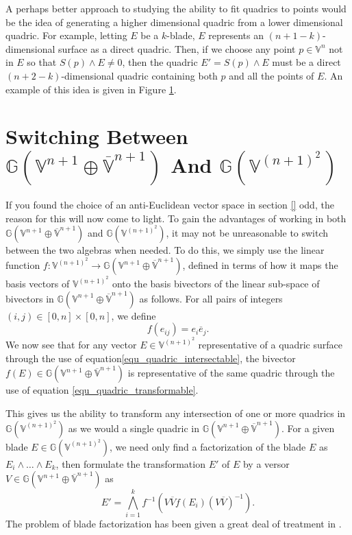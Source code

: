 \documentclass{birkjour}
\theoremstyle{definition}
\theoremstyle{remark}
\numberwithin{equation}{section}
\newcommand{\G}{\mathbb{G}}
\newcommand{\V}{\mathbb{V}}
\newcommand{\Vb}{\mathbb{\overline{V}}}
\begin{document}
A perhaps better approach to studying the ability to fit quadrics to
points would be the idea of generating a higher dimensional quadric
from a lower dimensional quadric.  For example, letting $E$ be a $k$-blade, $E$
represents an $(n+1-k)$-dimensional surface as a direct quadric.  Then,
if we choose any point $p\in\V^n$ not in $E$ so that $S(p)\wedge E\neq 0$,
then the quadric $E'=S(p)\wedge E$ must be a direct $(n+2-k)$-dimensional quadric containing
both $p$ and all the points of $E$.  An example of this idea is given in Figure \ref{}.



\section{Switching Between $\G(\V^{n+1}\oplus\Vb^{n+1})$ And $\G(\V^{(n+1)^2})$}


If you found the choice of an anti-Euclidean vector
space in section \eqref{} odd, the reason for this will
now come to light.  To gain the advantages of working
in both $\G(\V^{n+1}\oplus\Vb^{n+1})$ and $\G(\V^{(n+1)^2})$,
it may not be unreasonable to switch between the two
algebras when needed.  To do this, we simply use the linear
function $f:\V^{(n+1)^2}\to\G(\V^{n+1}\oplus\Vb^{n+1})$,
defined in terms of how it maps the basis vectors of $\V^{(n+1)^2}$ onto the
basis bivectors of the linear sub-space of bivectors in $\G(\V^{n+1}\oplus\Vb^{n+1})$ as follows.
For all pairs of integers $(i,j)\in[0,n]\times[0,n]$, we define
\begin{equation}
f(e_{ij})=e_i\overline{e}_j.
\end{equation}
We now see that for any vector $E\in\V^{(n+1)^2}$ representative of
a quadric surface through the use of equation\eqref{equ_quadric_intersectable}, the bivector
$f(E)\in\G(\V^{n+1}\oplus\Vb^{n+1})$ is representative of the same
quadric through the use of equation \eqref{equ_quadric_transformable}.

This gives us the ability to transform any intersection of one or more quadrics
in $\G(\V^{(n+1)^2})$ as we would a single quadric in $\G(\V^{n+1}\oplus\Vb^{n+1})$.
For a given blade $E\in\G(\V^{(n+1)^2})$, we need only find a factorization
of the blade $E$ as $E_i\wedge\dots\wedge E_k$, then formulate the transformation $E'$
of $E$ by a versor $V\in\G(\V^{n+1}\oplus\Vb^{n+1})$ as
\begin{equation}
E' = \bigwedge_{i=1}^k f^{-1}\left(V\overline{V}f(E_i)(V\overline{V})^{-1}\right).
\end{equation}
The problem of blade factorization has been given a great deal of treatment in \cite{}.
\end{document}
